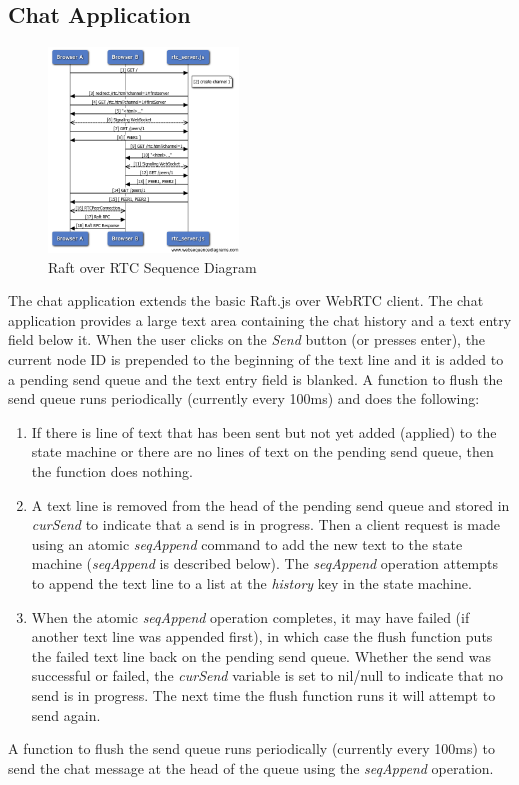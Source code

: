 \documentclass[conference,compsoc]{./IEEEtran/IEEEtran}
\begin{document}
\subsection{Chat Application}

\begin{figure}[!t]
  \centerline{\includegraphics[width=0.45\textwidth]{imgs/raft_rtc_sequence}}
  \caption{Raft over RTC Sequence Diagram}
    \label{fig:raft_rtc_sequence}
\end{figure}

The chat application extends the basic Raft.js over WebRTC client. The
chat application provides a large text area containing the chat
history and a text entry field below it. %
When the user clicks on the \emph{Send} button (or presses enter), the
current node ID is prepended to the beginning of the text line and it
is added to a pending send queue and the text entry field is blanked.
\ifdefined\OPTIONAL
A function to flush the send queue runs periodically (currently every
100ms) and does the following:

\begin{enumerate}
\item If there is line of text that has been sent but not yet
    added (applied) to the state machine or there are no lines of text
    on the pending send queue, then the function does nothing.
\item A text line is removed from the head of the pending send queue
    and stored in \emph{curSend} to indicate that a send is in
    progress. Then a client request is made using an atomic
    \emph{seqAppend} command to add the new text to the state machine
    (\emph{seqAppend} is described below).  The \emph{seqAppend}
    operation attempts to append the text line to a list at the
    \emph{history} key in the state machine.
\item When the atomic \emph{seqAppend} operation completes, it may
    have failed (if another text line was appended first), in which
    case the flush function puts the failed text line back on the
    pending send queue. Whether the send was successful or failed, the
    \emph{curSend} variable is set to nil/null to indicate that no
    send is in progress. The next time the flush function runs it will
    attempt to send again. %
\end{enumerate}
\else
A function to flush the send queue runs periodically (currently every
100ms) to send the chat message at the head of the queue using
the \emph{seqAppend} operation.
\fi
\end{document}
